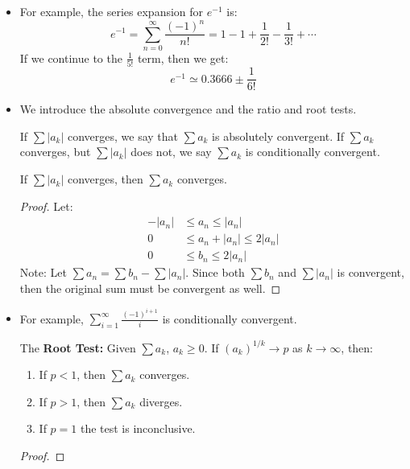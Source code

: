 \begin{itemize}
\begin{equation}
    \end{equation}
    \item For example, the series expansion for $e^{-1}$ is:
    \begin{equation}
        e^{-1} = \sum_{n=0}^\infty \frac{(-1)^n}{n!} = 1-1+\frac{1}{2!}-\frac{1}{3!}+\cdots
    \end{equation}
    If we continue to the $\frac{1}{5!}$ term, then we get:
    \begin{equation}
        e^{-1} \simeq 0.3666 \pm \frac{1}{6!}
    \end{equation}
    \item We introduce the absolute convergence and the ratio and root tests.
    \begin{definition}
        If $\sum |a_k|$ converges, we say that $\sum a_{k}$ is absolutely convergent. If $\sum a_k$ converges, but $\sum |a_k|$ does not, we say $\sum a_k$ is conditionally convergent.
    \end{definition}
    \begin{theorem}
        If $\sum |a_k|$ converges, then $\sum a_k$ converges.
    \end{theorem}
    \begin{proof}
        Let:
        \begin{align}
            -|a_n| &\le a_n \le |a_n| \\ 
            0 &\le a_n + |a_n| \le 2|a_n| \\ 
            0 &\le b_n \le 2|a_n|
        \end{align}
        Note: Let $\sum a_n = \sum b_n - \sum |a_n|$. Since both $\sum b_n$ and $\sum |a_n|$ is convergent, then the original sum must be convergent as well.
    \end{proof}
    \item For example, $\sum_{i=1}^\infty \frac{(-1)^{i+1}}{i}$ is conditionally convergent.
    \begin{theorem}
        The \textbf{Root Test:} Given $\sum a_k$, $a_k \ge 0$. If $(a_k)^{1/k} \to p$ as $k\to\infty$, then:
        \begin{enumerate}
            \item If $p<1$, then $\sum a_k$ converges.
            \item If $p>1$, then $\sum a_k$ diverges.
            \item If $p=1$ the test is inconclusive.
        \end{enumerate}
    \end{theorem}
    \begin{proof}

\end{proof}
\end{itemize}
